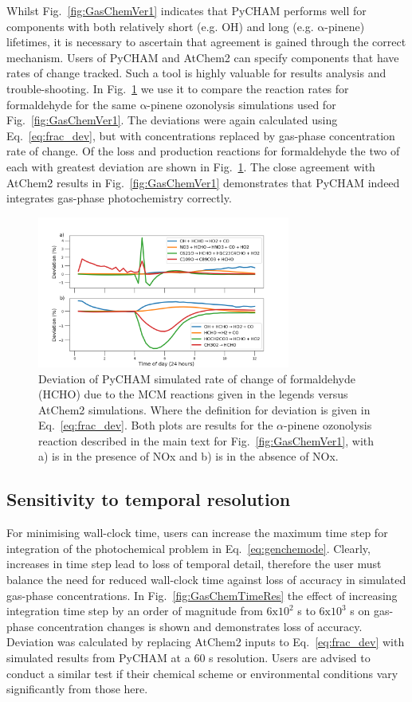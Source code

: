 \documentclass[gmd, manuscript]{copernicus}
\begin{document}
Whilst Fig.~\ref{fig:GasChemVer1} indicates that PyCHAM performs well for components with both relatively short (e.g. OH) and long (e.g. $\mathrm{\alpha}$-pinene) lifetimes, it is necessary to ascertain that agreement is gained through the correct mechanism.  Users of PyCHAM and AtChem2 can specify components that have rates of change tracked.  Such a tool is highly valuable for results analysis and trouble-shooting.  In Fig.~\ref{fig:GasChemVer2} we use it to compare the reaction rates for formaldehyde for the same $\mathrm{\alpha}$-pinene ozonolysis simulations used for Fig.~\ref{fig:GasChemVer1}.  The deviations were again calculated using Eq.~\ref{eq:frac_dev}, but with concentrations replaced by gas-phase concentration rate of change.  Of the loss and production reactions for formaldehyde the two of each with greatest deviation are shown in Fig.~\ref{fig:GasChemVer2}.  The close agreement with AtChem2 results in Fig.~\ref{fig:GasChemVer1} demonstrates that PyCHAM indeed integrates gas-phase photochemistry correctly.

\begin{figure}[t]
\includegraphics[width=8.3cm]{Results/photo_chem_grad_dev.png}
\caption{Deviation of PyCHAM simulated rate of change of formaldehyde (HCHO) due to the MCM reactions given in the legends versus AtChem2 simulations.  Where the definition for deviation is given in Eq.~\ref{eq:frac_dev}.  Both plots are results for the $\alpha$-pinene ozonolysis reaction described in the main text for Fig.~\ref{fig:GasChemVer1}, with a) is in the presence of NOx and b) is in the absence of NOx.}
\label{fig:GasChemVer2}
\end{figure}


\subsection{Sensitivity to temporal resolution}

For minimising wall-clock time, users can increase the maximum time step for integration of the photochemical problem in Eq.~\ref{eq:genchemode}.  Clearly, increases in time step lead to loss of temporal detail, therefore the user must balance the need for reduced wall-clock time against loss of accuracy in simulated gas-phase concentrations.  In Fig.~\ref{fig:GasChemTimeRes} the effect of increasing integration time step by an order of magnitude from $\mathrm{6x10^2}$ s to $\mathrm{6x10^3}$ s on gas-phase concentration changes is shown and demonstrates loss of accuracy.  Deviation was calculated by replacing AtChem2 inputs to Eq.~\ref{eq:frac_dev} with simulated results from PyCHAM at a 60 s resolution.  Users are advised to conduct a similar test if their chemical scheme or environmental conditions vary significantly from those here.
\end{document}

